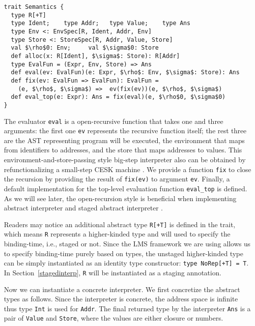 
\begin{lstlisting}
trait Semantics {
  type R[+T]
  type Ident;    type Addr;   type Value;    type Ans
  type Env <: EnvSpec[R, Ident, Addr, Env]
  type Store <: StoreSpec[R, Addr, Value, Store]
  val $\rho$0: Env;     val $\sigma$0: Store
  def alloc(x: R[Ident], $\sigma$: Store): R[Addr]
  type EvalFun = (Expr, Env, Store) => Ans
  def eval(ev: EvalFun)(e: Expr, $\rho$: Env, $\sigma$: Store): Ans
  def fix(ev: EvalFun => EvalFun): EvalFun = 
    (e, $\rho$, $\sigma$) =>  ev(fix(ev))(e, $\rho$, $\sigma$)
  def eval_top(e: Expr): Ans = fix(eval)(e, $\rho$0, $\sigma$0)
}
\end{lstlisting}

The evaluator \texttt{eval} is a open-recursive function that takes one and three arguments: the first
one \texttt{ev} represents the recursive function itself; the rest three are the AST representing program 
will be executed, the environment that maps from identifiers to addresses, and the store that maps addresses to values.
This environment-and-store-passing style big-step interpreter also can be obtained by 
refunctionalizing \cite{DBLP:conf/ppdp/AgerBDM03, Wei:2018:RAA:3243631.3236800} a small-step CESK 
machine \cite{DBLP:conf/popl/FelleisenF87}.
We provide a function \texttt{fix} to close the recursion by providing the result of \texttt{fix(ev)} 
to argument \texttt{ev}. Finally, a default implementation for the top-level evaluation function \texttt{eval\_top} is defined.
As we will see later, the open-recursion style is beneficial when implementing abstract interpreter and 
staged abstract interpreter .

Readers may notice an additional abstract type \texttt{R[+T]} is defined in the trait,
which means \texttt{R} represents a higher-kinded type and will used to specify the binding-time, 
i.e., staged or not. Since the LMS framework we are using allows us to specify binding-time purely
based on types, the unstaged higher-kinded type can be simply instantiated as an identity type constructor: 
\texttt{type NoRep[+T] = T}. In Section~\ref{stagedinterp}, \texttt{R} will be instantiated 
as a staging annotation. 

Now we can instantiate a concrete interpreter. We first concretize the abstract types as follows.
Since the interpreter is concrete, the address space is infinite thus type \texttt{Int} is used for \texttt{Addr}.
The final returned type by the interpreter \texttt{Ans} is a pair of \texttt{Value} and \texttt{Store}, 
where the values are either closure or numbers.

